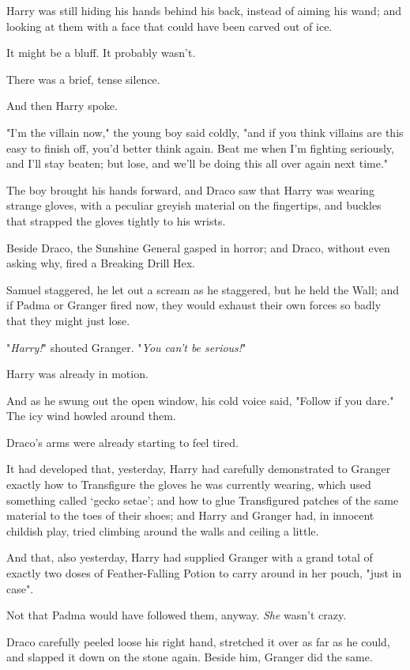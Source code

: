 Harry was still hiding his hands behind his back, instead of aiming his wand;
and looking at them with a face that could have been carved out of ice.

It might be a bluff. It probably wasn't.

There was a brief, tense silence.

And then Harry spoke.

"I'm the villain now," the young boy said coldly, "and if you think villains
are this easy to finish off, you'd better think again. Beat me when I'm
fighting seriously, and I'll stay beaten; but lose, and we'll be doing this all
over again next time."

The boy brought his hands forward, and Draco saw that Harry was wearing strange
gloves, with a peculiar greyish material on the fingertips, and buckles that
strapped the gloves tightly to his wrists.

Beside Draco, the Sunshine General gasped in horror; and Draco, without even
asking why, fired a Breaking Drill Hex.

Samuel staggered, he let out a scream as he staggered, but he held the Wall;
and if Padma or Granger fired now, they would exhaust their own forces so badly
that they might just lose.

"\emph{Harry!}" shouted Granger. "\emph{You can't be serious!}"

Harry was already in motion.

And as he swung out the open window, his cold voice said, "Follow if you dare."
\sbreak
The icy wind howled around them.

Draco's arms were already starting to feel tired.

{\el} It had developed that, yesterday, Harry had carefully demonstrated to
Granger exactly how to Transfigure the gloves he was currently wearing, which
used something called `gecko setae'; and how to glue Transfigured patches of
the same material to the toes of their shoes; and Harry and Granger had, in
innocent childish play, tried climbing around the walls and ceiling a little.

And that, also yesterday, Harry had supplied Granger with a grand total of
exactly two doses of Feather-Falling Potion to carry around in her pouch, "just
in case".

Not that Padma would have followed them, anyway. \emph{She} wasn't crazy.

Draco carefully peeled loose his right hand, stretched it over as far as he
could, and slapped it down on the stone again. Beside him, Granger did the same.

